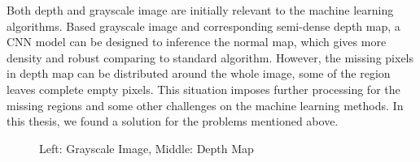 Both depth and grayscale image are initially relevant to the machine learning algorithms. Based grayscale image and corresponding semi-dense depth map, a CNN model can be designed to inference the normal map, which gives more density and robust comparing to standard algorithm. However, the missing pixels in depth map can be distributed around the whole image, some of the region leaves complete empty pixels. This situation imposes further processing for the missing regions and some other challenges on the machine learning methods. 
In this thesis, we found a solution for the problems mentioned above.

\begin{figure}[!h]
	\centering
	\caption{Left: Grayscale Image, Middle: Depth Map}
	\label{fig:improved_normal_inference}
\end{figure}























